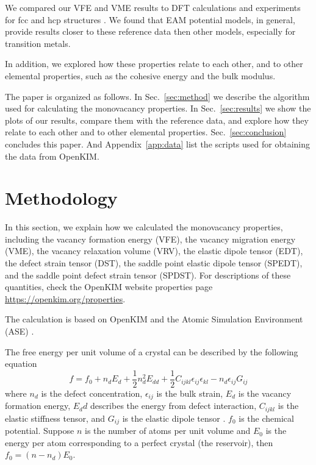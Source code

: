 \documentclass[%
 reprint,
 amsmath,amssymb,
 aps,
]{revtex4-1}
\begin{document}
We compared our VFE and VME results to DFT calculations and experiments for fcc and hcp structures \cite{angsten2014elemental}.
We found that EAM potential models, in general, provide results closer to these reference data then other models, especially for transition metals.

In addition, we explored how these properties relate to each other, and to other elemental properties, such as the cohesive energy and the bulk modulus.

The paper is organized as follows.
In Sec.~\ref{sec:method} we describe the algorithm used for calculating the monovacancy properties.
In Sec.~\ref{sec:results} we show the plots of our results, compare them with the reference data, and explore how they relate to each other and to other elemental properties.
Sec.~\ref{sec:conclusion} concludes this paper.
And Appendix~\ref{app:data} list the scripts used for obtaining the data from OpenKIM.

\section{\label{sec:method}Methodology}

In this section, we explain how we calculated the monovacancy properties, including the vacancy formation energy (VFE), the vacancy migration energy (VME), the vacancy relaxation volume (VRV), the elastic dipole tensor (EDT), the defect strain tensor (DST), the saddle point elastic dipole tensor (SPEDT), and the saddle point defect strain tensor (SPDST).
For descriptions of these quantities, check the OpenKIM website properties page \url{https://openkim.org/properties}.

The calculation is based on OpenKIM and the Atomic Simulation Environment (ASE) \cite{bahn2002object}.

The free energy per unit volume of a crystal can be described by the following equation
\begin{equation}\label{eq:f}
f = f_0 + n_dE_d + \frac{1}{2}n_d^2E_{dd} + \frac{1}{2}C_{ijkl}\epsilon_{ij}\epsilon_{kl} - n_d\epsilon_{ij}G_{ij}
\end{equation}
where $n_d$ is the defect concentration, $\epsilon_{ij}$ is the bulk strain, $E_d$ is the vacancy formation energy, $E_dd$ describes the energy from defect interaction, $C_{ijkl}$ is the elastic stiffness tensor, and $G_{ij}$ is the elastic dipole tensor \cite{freedman2009elastic}.
$f_0$ is the chemical potential.
Suppose $n$ is the number of atoms per unit volume and $E_0$ is the energy per atom corresponding to a perfect crystal (the reservoir), then $f_0 = (n - n_d) E_{0}$.
\end{document}
